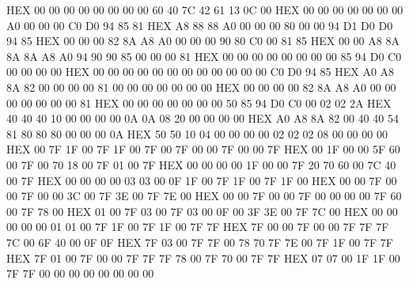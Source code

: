 \documentclass[10pt]{report}
\begin{document}
    HEX     00 00 00 00 00 00 00 00 60 40 7C 42 61 13 0C 00
    HEX     00 00 00 00 00 00 00 A0 00 00 00 C0 D0 94 85 81
    HEX     A8 88 88 A0 00 00 00 80 00 00 94 D1 D0 D0 94 85
    HEX     00 00 00 82 8A A8 A0 00 00 00 90 80 C0 00 81 85
    HEX     00 00 A8 8A 8A 8A A8 A0 94 90 90 85 00 00 00 81
    HEX     00 00 00 00 00 00 00 00 85 94 D0 C0 00 00 00 00
    HEX     00 00 00 00 00 00 00 00 00 00 00 00 C0 D0 94 85
    HEX     A0 A8 8A 82 00 00 00 00 81 00 00 00 00 00 00 00
    HEX     00 00 00 00 82 8A A8 A0 00 00 00 00 00 00 00 81
    HEX     00 00 00 00 00 00 00 50 85 94 D0 C0 00 02 02 2A
    HEX     40 40 40 10 00 00 00 00 0A 0A 08 20 00 00 00 00
    HEX     A0 A8 8A 82 00 40 40 54 81 80 80 80 00 00 00 0A
    HEX     50 50 10 04 00 00 00 00 02 02 02 08 00 00 00 00
    HEX     00 7F 1F 00 7F 1F 00 7F 00 7F 00 00 7F 00 00 7F
    HEX     00 1F 00 00 5F 60 00 7F 00 70 18 00 7F 01 00 7F
    HEX     00 00 00 00 1F 00 00 7F 20 70 60 00 7C 40 00 7F
    HEX     00 00 00 00 03 03 00 0F 1F 00 7F 1F 00 7F 1F 00
    HEX     00 00 7F 00 00 7F 00 00 3C 00 7F 3E 00 7F 7E 00
    HEX     00 00 7F 00 00 7F 00 00 00 00 7F 60 00 7F 78 00
    HEX     01 00 7F 03 00 7F 03 00 0F 00 3F 3E 00 7F 7C 00
    HEX     00 00 00 00 00 01 01 00 7F 1F 00 7F 1F 00 7F 7F
    HEX     7F 00 00 7F 00 00 7F 7F 7F 7C 00 6F 40 00 0F 0F
    HEX     7F 03 00 7F 7F 00 78 70 7F 7E 00 7F 1F 00 7F 7F
    HEX     7F 01 00 7F 00 00 7F 7F 7F 78 00 7F 70 00 7F 7F
    HEX     07 07 00 1F 1F 00 7F 7F 00 00 00 00 00 00 00 00
\nwendcode{}\nwdocspar
\end{document}
